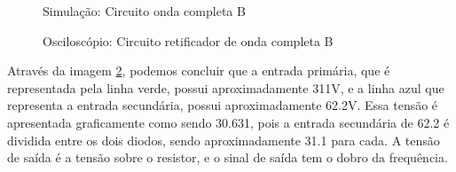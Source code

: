 \begin{figure}[H]
    \centering
    \caption{Simulação: Circuito onda completa B}
    \vspace{-0.3cm}
    \label{fig:SimulacaoCircuito06OndaCompleta}
\end{figure}

\begin{figure}[H]
    \centering
    \caption{Osciloscópio: Circuito retificador de onda completa B}
    \vspace{-0.3cm}
    \label{fig:OsciloscopioCircuito06}
\end{figure}

Através da imagem \ref{fig:OsciloscopioCircuito06}, podemos concluir que a entrada primária, que é representada pela linha verde, possui aproximadamente 311V, e a linha azul que representa a entrada secundária, possui aproximadamente 62.2V. Essa tensão é apresentada graficamente como sendo 30.631, pois a entrada secundária de 62.2 é dividida entre os dois diodos, sendo aproximadamente 31.1 para cada. A tensão de saída é a tensão sobre o resistor, e o sinal de saída tem o dobro da frequência.

